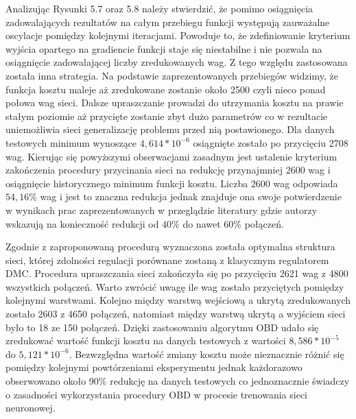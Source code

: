 \par Analizując Rysunki 5.7 oraz 5.8 należy stwierdzić, że pomimo osiągnięcia zadowalających rezultatów na całym przebiegu funkcji występują zauważalne oscylacje pomiędzy kolejnymi iteracjami. Powoduje to, że zdefiniowanie kryterium wyjścia opartego na gradiencie funkcji staje się niestabilne i nie pozwala na osiągnięcie zadowalającej liczby zredukowanych wag. Z tego względu zastosowana została inna strategia. Na podstawie zaprezentowanych przebiegów widzimy, że funkcja kosztu maleje aż zredukowane zostanie około 2500 czyli nieco ponad połowa wag sieci. Dalsze upraszczanie prowadzi do utrzymania kosztu na prawie stałym poziomie aż przycięte zostanie zbyt dużo parametrów co w rezultacie uniemożliwia sieci generalizację problemu przed nią postawionego. Dla danych testowych minimum wynoszące \( 4,614*10^{-6} \) osiągnięte zostało po przycięciu 2708 wag. Kierując się powyższymi obserwacjami zasadnym jest ustalenie kryterium zakończenia procedury przycinania sieci na redukcję przynajmniej 2600 wag i osiągnięcie historycznego minimum funkcji kosztu. Liczba 2600 wag odpowiada \(54,16 \% \) wag i jest to znaczna redukcja jednak znajduje ona swoje potwierdzenie w wynikach prac zaprezentowanych w przeglądzie literatury gdzie autorzy wskazują na konieczność redukcji od \(40\%\) do nawet \(60\%\) połączeń.

\par Zgodnie z zaproponowaną procedurą wyznaczona została optymalna struktura sieci, której zdolności regulacji porównane zostaną z klasycznym regulatorem DMC. Procedura upraszczania sieci zakończyła się po przycięciu 2621 wag z 4800 wszystkich połączeń. Warto zwrócić uwagę ile wag zostało przyciętych pomiędzy kolejnymi warstwami. Kolejno między warstwą wejściową a ukrytą zredukowanych zostało 2603 z 4650 połączeń, natomiast między warstwą ukrytą a wyjściem sieci było to 18 ze 150 połączeń. Dzięki zastosowaniu algorytmu OBD udało się zredukować wartość funkcji kosztu na danych testowych z wartości \( 8,586*10^{-5} \) do \( 5,121*10^{-6} \). Bezwzględna wartość zmiany kosztu może nieznacznie różnić się pomiędzy kolejnymi powtórzeniami eksperymentu jednak każdorazowo obserwowano około 90\% redukcję na danych testowych co jednoznacznie świadczy o zasadności wykorzystania procedury OBD w procesie trenowania sieci neuronowej.

